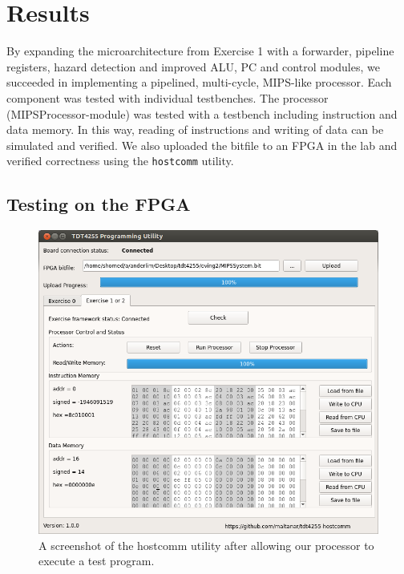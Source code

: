 \chapter{Results}

By expanding the microarchitecture from Exercise 1 \cite{compendium} with a forwarder, pipeline registers, hazard detection and improved ALU, PC and control modules, we succeeded in implementing a pipelined, multi-cycle, MIPS-like processor.
Each component was tested with individual testbenches.
The processor (MIPSProcessor-module) was tested with a testbench including instruction and data memory.
In this way, reading of instructions and writing of data can be simulated and verified.
We also uploaded the bitfile to an FPGA in the lab and verified correctness using the \texttt{hostcomm} utility.

\section{Testing on the FPGA}

\begin{figure}[h!]
    \includegraphics[width=\linewidth]{img/hostcomm_result.png}
    \caption{A screenshot of the hostcomm utility after allowing our processor to execute a test program.}
    \label{fig:hostcomm}
\end{figure}

